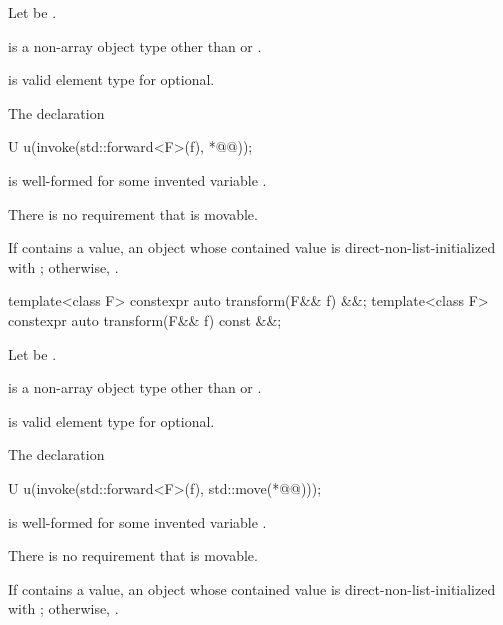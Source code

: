 \begin{itemdescr}
\pnum
Let  be .

\pnum
\mandates
\begin{removedblock}
 is a non-array object type
other than  or .
\end{removedblock}
\begin{addedblock}
 is valid element type for optional.
\end{addedblock}
The declaration
\begin{codeblock}
U u(invoke(std::forward<F>(f), *@@));
\end{codeblock}
is well-formed for some invented variable .
\begin{note}
There is no requirement that  is movable.
\end{note}

\pnum
\returns
If  contains a value, an  object
whose contained value is direct-non-list-initialized with
;
otherwise, .
\end{itemdescr}

\begin{itemdecl}
template<class F> constexpr auto transform(F&& f) &&;
template<class F> constexpr auto transform(F&& f) const &&;
\end{itemdecl}

\begin{itemdescr}
\pnum
Let  be
.

\pnum
\mandates
\begin{removedblock}
 is a non-array object type
other than  or .
\end{removedblock}
\begin{addedblock}
 is valid element type for optional.
\end{addedblock}
The declaration
\begin{codeblock}
U u(invoke(std::forward<F>(f), std::move(*@@)));
\end{codeblock}
is well-formed for some invented variable .
\begin{note}
There is no requirement that  is movable.
\end{note}

\pnum
\returns
If  contains a value, an  object
whose contained value is direct-non-list-initialized with
;
otherwise, .
\end{itemdescr}

